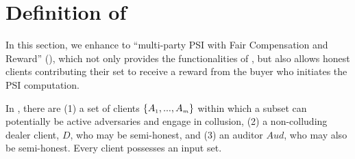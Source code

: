 



 \vspace{-5mm}

\section{Definition of \ep}
 \vspace{-2mm}

In this section, we enhance \p to ``multi-party PSI with Fair Compensation and Reward'' (\ep), which not only provides the functionalities of \p,  but also allows honest clients contributing their set to receive a reward from the buyer who initiates the PSI computation.








%  


In \ep, there are (1) a set of clients $\{A_{\scriptscriptstyle 1},...,A_{\scriptscriptstyle m}\}$ within which a subset can potentially be active adversaries and engage in collusion, (2) a non-colluding dealer client, $D$, who may be semi-honest, and (3) an auditor $Aud$, who may also be semi-honest.  Every client possesses an input set. 


